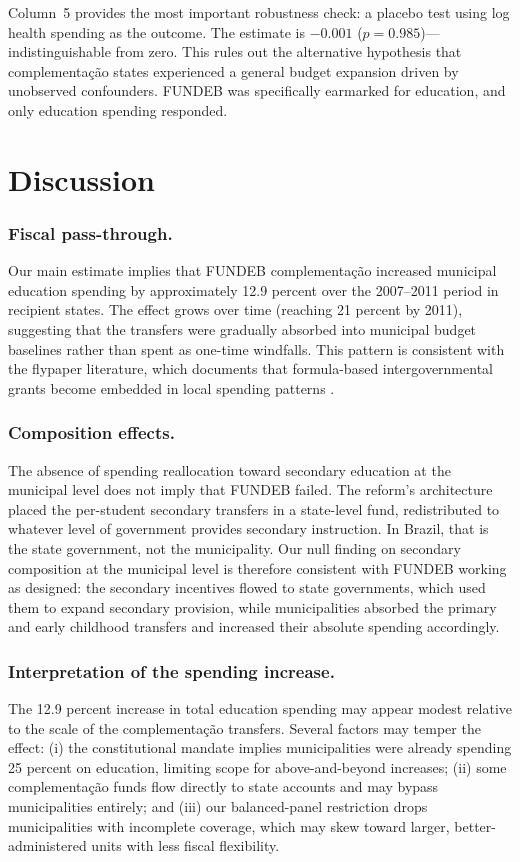 \documentclass[12pt]{article}
\begin{document}
Column~5 provides the most important robustness check: a placebo test using log
health spending as the outcome. The estimate is $-0.001$ ($p = 0.985$)---indistinguishable
from zero. This rules out the alternative hypothesis that complementa\c{c}\~ao states
experienced a general budget expansion driven by unobserved confounders. FUNDEB was
specifically earmarked for education, and only education spending responded.



\section{Discussion}

\subsubsection*{Fiscal pass-through.} Our main estimate implies that FUNDEB complementa\c{c}\~ao
increased municipal education spending by approximately 12.9 percent over the 2007--2011
period in recipient states. The effect grows over time (reaching 21 percent by 2011),
suggesting that the transfers were gradually absorbed into municipal budget baselines
rather than spent as one-time windfalls. This pattern is consistent with the flypaper
literature, which documents that formula-based intergovernmental grants become embedded
in local spending patterns \citep{bailey1998}.

\subsubsection*{Composition effects.} The absence of spending reallocation toward
secondary education at the municipal level does not imply that FUNDEB failed. The
reform's architecture placed the per-student secondary transfers in a state-level fund,
redistributed to whatever level of government provides secondary instruction. In Brazil,
that is the state government, not the municipality. Our null finding on secondary
composition at the municipal level is therefore consistent with FUNDEB working as
designed: the secondary incentives flowed to state governments, which used them to
expand secondary provision, while municipalities absorbed the primary and early
childhood transfers and increased their absolute spending accordingly.

\subsubsection*{Interpretation of the spending increase.} The 12.9 percent increase in
total education spending may appear modest relative to the scale of the complementa\c{c}\~ao
transfers. Several factors may temper the effect: (i) the constitutional mandate implies
municipalities were already spending 25 percent on education, limiting scope for above-and-beyond
increases; (ii) some complementa\c{c}\~ao funds flow directly to state accounts and may
bypass municipalities entirely; and (iii) our balanced-panel restriction drops municipalities
with incomplete coverage, which may skew toward larger, better-administered units with
less fiscal flexibility.
\end{document}
